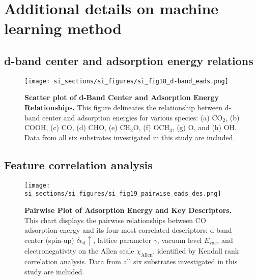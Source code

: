 

\section{Additional details on machine learning method}

\subsection{d-band center and adsorption energy relations}


\begin{figure}
  \centering
  \texttt{[image: si\_sections/si\_figures/si\_fig18\_d-band\_eads.png]}
  \caption{\textbf{Scatter plot of d-Band Center and Adsorption Energy Relationships.}
  This figure delineates the relationship between d-band center and adsorption energies for
  various species: (a) CO$_2$, (b) COOH, (c) CO, (d) CHO, (e) CH$_2$O, (f) OCH$_3$, (g) O, and (h) OH.
  Data from all six substrates investigated in this study are included.}
  \label{si_fig18:dband_vs_eads}
\end{figure}


\subsection{Feature correlation analysis}


\begin{figure}
  \centering
  \texttt{[image: si\_sections/si\_figures/si\_fig19\_pairwise\_eads\_des.png]}
  \caption{\textbf{Pairwise Plot of Adsorption Energy and Key Descriptors.}
  This chart displays the pairwise relationships between CO adsorption energy and
  its four most correlated descriptors: d-band center (spin-up) $\delta\epsilon_{\text{d}}\uparrow$,
  lattice parameter $\gamma$, vacuum level $E_\text{vac}$, and electronegativity
  on the Allen scale $\chi_\text{Allen}$, identified by Kendall rank correlation analysis.
  Data from all six substrates investigated in this study are included.}
  \label{si_fig19:pairwise_eads_des}
\end{figure}


